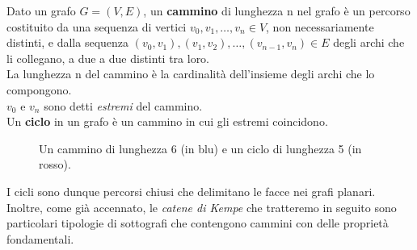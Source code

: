 \documentclass[a4paper,12pt,titlepage]{report}
\begin{document}
	\begin{dfn}
		Dato un grafo $G = (V,E)$, un {\bfseries cammino} di lunghezza n nel grafo è un percorso costituito da una sequenza di vertici $v_0, v_1, \dots, v_n \in V$, non necessariamente distinti, e dalla sequenza $(v_0,v_1), (v_1,v_2), \dots, (v_{n-1},v_n) \in E$ degli archi che li collegano, a due a due distinti tra loro. 
		\\La lunghezza n del cammino è la cardinalità dell'insieme degli archi che lo compongono.
		\\$v_0$ e $v_n$ sono detti \emph{estremi} del cammino.
	    \\Un {\bfseries ciclo} in un grafo è un cammino in cui gli estremi coincidono. 
	\end{dfn}
	\begin{figure}[h]
		\centering
		\vspace{0.5cm}
		\caption{Un cammino di lunghezza 6 (in blu) e un ciclo di lunghezza 5 (in rosso).} 
	\end{figure}
	\noindent I cicli sono dunque percorsi chiusi che delimitano le facce nei grafi planari.
	\\Inoltre, come già accennato, le \emph{catene di Kempe} che tratteremo in seguito sono particolari tipologie di sottografi che contengono cammini con delle proprietà fondamentali.
	
\end{document}
